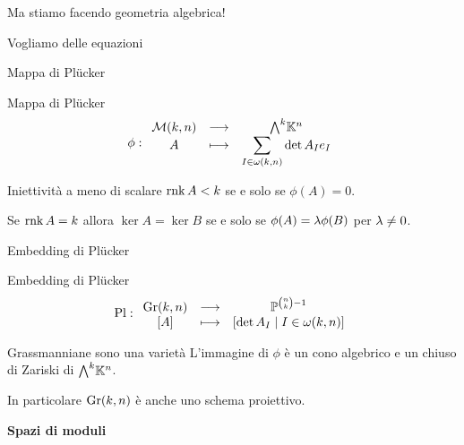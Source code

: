 \documentclass[a4paper]{beamer}
\begin{document}
\begin{frame}{}
\begin{center}
{\huge Ma stiamo facendo geometria algebrica!} 
\pause
\bigskip

{\Large Vogliamo delle equazioni}
\end{center}
\end{frame}

\begin{frame}{Mappa di Pl\"ucker}
\begin{block}{Mappa di Pl\"ucker}
\[\phi:\funcDef{\Mc(k,n)}{\bw\K^n}{A}{\displaystyle\sum_{I\in \omega(k,n)}\det A_I e_I}\]
\end{block}

\pause
\begin{alertblock}{Iniettivit\`a a meno di scalare}
$\mathrm{rnk}\, A<k$ se e solo se $\phi(A)=0$. 

Se $\mathrm{rnk}\, A=k$ allora $\ker A=\ker B$ se e solo se $\phi(A)=\lambda \phi(B)$ per $\lambda\neq 0$.
\end{alertblock}
\end{frame}

\begin{frame}{Embedding di Pl\"ucker}
\begin{block}{Embedding di Pl\"ucker}
\[\mathrm{Pl}:\begin{array}{ccc} {\mathrm{Gr}(k,n)} & \longrightarrow & {\mathbb{P}^{\binom nk-1}}\\ {[A]} & \longmapsto & {[\det A_I\mid I\in\omega(k,n)]} \end{array}\]
\end{block}
\pause
\begin{alertblock}{Grassmanniane sono una variet\`a}
L'immagine di $\phi$ \`e un cono algebrico e un chiuso di Zariski di $\bw \K^n$.
\end{alertblock}
\pause
In particolare $\mathrm{Gr}(k,n)$ \`e anche uno schema proiettivo.
\end{frame}



\begin{frame}{}
\begin{center}
{\huge \textbf{Spazi di moduli}}
\end{center}
\end{frame}
\end{document}
